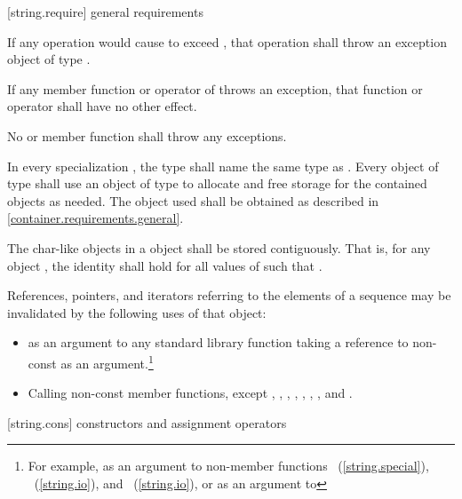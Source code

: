 [string.require]{ general requirements}

\pnum
If any operation would cause  to
exceed , that operation shall throw an
exception object of type .

\pnum
If any member function or operator of  throws an exception, that
function or operator shall have no other effect.

\pnum
No  or  member function shall throw any exceptions.

\pnum
In every specialization ,
the type  shall name the same type
as . Every object of type
 shall use an object of type
 to allocate and free storage for the contained 
objects as needed. The  object used shall be
obtained as described in \ref{container.requirements.general}.

\pnum
The char-like objects in a  object shall be
stored contiguously. That is, for any  object ,
the identity  shall hold for all
values of  such that .

\pnum
References, pointers, and iterators referring to the elements of a
 sequence may be
invalidated by the following uses of that  object:

\begin{itemize}
\item as an argument to any standard library function taking a reference to non-const
 as an argument.\footnote{For example, as an argument to non-member
functions ~(\ref{string.special}),
~(\ref{string.io}), and ~(\ref{string.io}), or as
an argument to }

\item Calling non-const member functions, except
,
,
,
,
,
,
,
and
.
\end{itemize}

[string.cons]{ constructors and assignment operators}

